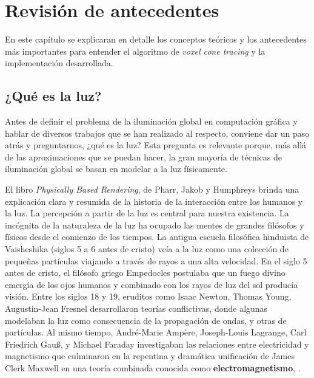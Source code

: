 \graphicspath{{chapters/2_antecedentes/figures/}}

\chapter{Revisión de antecedentes}


En este capítulo se explicaran en detalle los conceptos teóricos y los antecedentes más importantes para entender el algoritmo de \textit{voxel cone tracing} y la implementación desarrollada.

\section{¿Qué es la luz?}

Antes de definir el problema de la iluminación global en computación gráfica y hablar de diversos trabajos que se han realizado al respecto, conviene dar un paso atrás y preguntarnos, ¿qué es la luz?
Esta pregunta es relevante porque, más allá de las aproximaciones que se puedan hacer, la gran mayoría de técnicas de iluminación global se basan en modelar a la luz físicamente.

El libro \textit{Physically Based Rendering}, de Pharr, Jakob y Humphreys \cite{pbr} brinda una explicación clara y resumida de la historia de la interacción entre los humanos y la luz.
La percepción a partir de la luz es central para nuestra existencia.
La incógnita de la naturaleza de la luz ha ocupado las mentes de grandes filósofos y físicos desde el comienzo de los tiempos.
La antigua escuela filosófica hinduista de Vaisheshika (siglos 5 a 6 antes de cristo) veía a la luz como una colección de pequeñas partículas viajando a través de rayos a una alta velocidad.
En el siglo 5 antes de cristo, el filósofo griego Empedocles postulaba que un fuego divino emergía de los ojos humanos y combinado con los rayos de luz del sol producía visión.
Entre los siglos 18 y 19, eruditos como Isaac Newton, Thomas Young, Augustin-Jean Fresnel desarrollaron teorías conflictivas, donde algunas modelaban la luz como consecuencia de la propagación de ondas, y otras de partículas.
Al mismo tiempo, André-Marie Ampère, Joseph-Louis Lagrange, Carl Friedrich Gauß, y Michael Faraday investigaban las relaciones entre electricidad y magnetismo que culminaron en la repentina y dramática unificación de James Clerk Maxwell en una teoría combinada conocida como \textbf{electromagnetismo}, \cite{maxwell-equations}.


